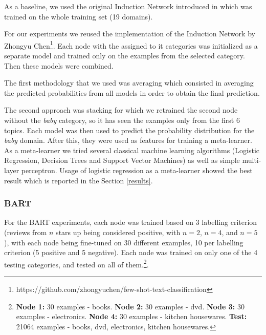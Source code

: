 \documentclass{esannV2}
\begin{document}
            
        As a baseline, we used the original Induction Network introduced in \cite{geng-etal-2019-induction} which was trained on the whole training set (19 domains). %
        
        For our experiments we reused the implementation of the Induction Network by Zhongyu Chen\footnote{https://github.com/zhongyuchen/few-shot-text-classification}. Each node with the assigned to it categories was initialized as a separate model and trained only on the examples from the selected category. Then these models were combined. 
        
        The first methodology that we used was averaging which consisted in averaging the predicted probabilities from all models in order to obtain the final prediction. 
        
        The second approach was stacking for which we retrained the second node without the \textit{baby} category, so it has seen the examples only from the first 6 topics. Each model was then used to predict the probability distribution for the \textit{baby} domain. After this, they were used as features for training a meta-learner. As a meta-learner we tried several classical machine learning algorithms (Logistic Regression, Decision Trees and Support Vector Machines) as well as simple multi-layer perceptron. Usage of logistic regression as a meta-learner showed the best result which is reported in the Section \ref{results}. 
        
        
    \subsubsection{BART}
        \label{data_b}
        
        For the BART experiments, each node was trained based on 3 labelling criterion (reviews from $n$ stars up being considered positive, with $n = 2$, $n = 4$, and $n = 5$), with each node being fine-tuned on 30 different examples, 10 per labelling criterion (5 positive and 5 negative). Each node was trained on only one of the 4 testing categories, and tested on all of them.\footnote{
        \textbf{Node 1:} 30 examples - books.
        \textbf{Node 2:} 30 examples - dvd.
        \textbf{Node 3:} 30 examples - electronics.
        \textbf{Node 4:} 30 examples - kitchen housewares.
        \textbf{Test:} 21064 examples - books, dvd, electronics, kitchen housewares.}.
\end{document}
